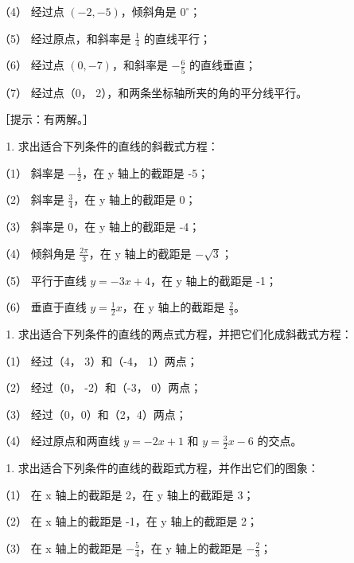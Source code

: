 （4） 经过点 \((-2, -5)\)，倾斜角是 \(0^{\circ}\)；

（5） 经过原点，和斜率是 \(\frac{1}{4}\) 的直线平行；

（6） 经过点 \((0,-7)\)，和斜率是 \(-\frac{6}{5}\) 的直线垂直；

（7） 经过点（0， 2），和两条坐标轴所夹的角的平分线平行。

［提示：有两解。］

\begin{enumerate}
\def\labelenumi{\arabic{enumi}.}
\setcounter{enumi}{1}
\tightlist
\item
  求出适合下列条件的直线的斜截式方程：
\end{enumerate}

（1） 斜率是 \(-\frac{1}{2}\)，在 y 轴上的截距是 -5；

（2） 斜率是 \(\frac{3}{4}\)，在 y 轴上的截距是 0；

（3） 斜率是 0，在 y 轴上的截距是 -4；

（4） 倾斜角是 \(\frac{2\pi}{3}\)，在 y 轴上的截距是 \(-\sqrt{3}\)；

（5） 平行于直线 \(y = -3x + 4\)，在 y 轴上的截距是 -1；

（6） 垂直于直线 \(y = \frac{1}{2}x\)，在 y 轴上的截距是
\(\frac{2}{3}\)。

\begin{enumerate}
\def\labelenumi{\arabic{enumi}.}
\setcounter{enumi}{2}
\tightlist
\item
  求出适合下列条件的直线的两点式方程，并把它们化成斜截式方程：
\end{enumerate}

（1） 经过（4， 3）和（-4， 1）两点；

（2） 经过（0， -2）和（-3， 0）两点；

（3） 经过（0，0）和（2，4）两点；

（4） 经过原点和两直线 \(y = -2x + 1\) 和 \(y = \frac{3}{2}x - 6\)
的交点。

\begin{enumerate}
\def\labelenumi{\arabic{enumi}.}
\setcounter{enumi}{3}
\tightlist
\item
  求出适合下列条件的直线的截距式方程，并作出它们的图象：
\end{enumerate}

（1） 在 x 轴上的截距是 2，在 y 轴上的截距是 3；

（2） 在 x 轴上的截距是 -1，在 y 轴上的截距是 2；

（3） 在 x 轴上的截距是 \(-\frac{5}{4}\)，在 y 轴上的截距是
\(-\frac{2}{3}\)；

